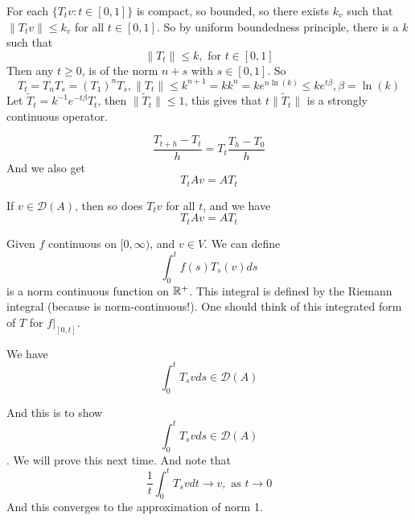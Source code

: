 For each $\{T_tv:t\in [0,1]\}$ is compact, so bounded, so there exists $k_v$ such that $\|T_tv\|\leq k_v$ for all $t\in [0,1]$. So by uniform boundedness principle, there is a $k$ such that
\begin{equation*}
    \|T_t\|\leq k, \text{ for } t\in [0,1]
\end{equation*}
Then any $t\geq 0$, is of the norm $n+s$ with $s\in [0,1]$. So
\begin{equation*}
    T_t=T_nT_s=(T_1)^nT_s, \|T_t\|\leq k^{n+1}=kk^n=ke^{n\ln(k)}\leq ke^{t\beta}, \beta=\ln(k)
\end{equation*}
Let $\tilde{T}_t=k^{-1}e^{-t\beta}T_t$, then $\|\tilde{T}_t\|\leq 1$, this gives that $t\|\tilde{T}_t\|$ is a strongly continuous operator.

\begin{equation*}
    \frac{T_{t+h}-T_t}{h}=T_t\frac{T_h-T_0}{h}
\end{equation*}
And we also get
\begin{equation*}
    T_tAv=AT_t
\end{equation*}
\begin{proposition}
    If $v\in\mathcal{D}(A)$, then so does $T_tv$ for all $t$, and we have
    \begin{equation*}
        T_tAv=AT_t
    \end{equation*}
\end{proposition}
Given $f$ continuous on $[0,\infty)$, and $v\in V$. We can define 
\begin{equation*}
    \int_0^tf(s)T_s(v)ds 
\end{equation*}
is a norm continuous function on $\mathbb{R}^+$. This integral is defined by the Riemann integral (because is norm-continuous!).
One should think of this integrated form of $T$ for $f\vert_{[0,t]}$.
\begin{proposition}
    We have
    \begin{equation*}
        \int_0^tT_svds\in\mathcal{D}(A)
    \end{equation*}
\end{proposition}
And this is to show 
\begin{equation*}
    \int_0^tT_svds\in\mathcal{D}(A)
\end{equation*}. We will prove this next time. And note that
\begin{equation*}
    \frac{1}{t}\int_0^tT_svdt\to v, \text{ as } t\to 0
\end{equation*}
And this converges to the approximation of norm 1.


